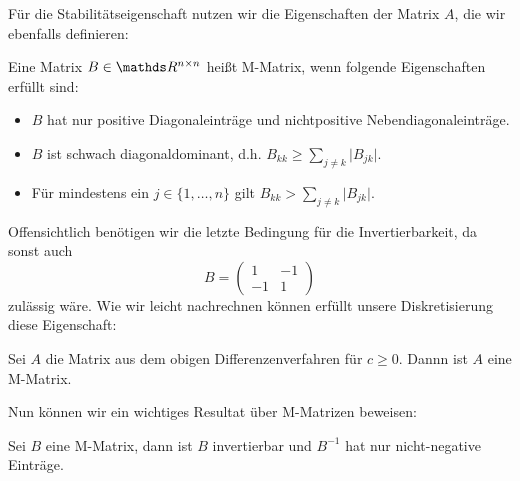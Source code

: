 F\"ur die Stabilit\"atseigenschaft nutzen wir die Eigenschaften der Matrix $A$, die wir ebenfalls definieren:
\begin{definition}{}{}
Eine Matrix $B \in \R^{n \times n}$ hei{\ss}t M-Matrix, wenn folgende Eigenschaften erf\"ullt sind:
\begin{itemize}
\item $B$ hat nur positive Diagonaleintr\"age und nichtpositive Nebendiagonaleintr\"age.
\item $B$ ist schwach diagonaldominant, d.h. $B_{kk} \geq \sum_{j \neq k} \vert B_{jk} \vert $.
\item F\"ur mindestens ein $j \in \{1,\ldots,n\}$ gilt $B_{kk} > \sum_{j \neq k} \vert B_{jk} \vert $.
\end{itemize}
\end{definition}{}{}
Offensichtlich ben\"otigen wir die letzte Bedingung f\"ur die Invertierbarkeit, da sonst auch
$$ B= \left( \begin{array}{cc} 1 & -1 \\ -1 & 1 \end{array} \right) $$
zul\"assig w\"are. Wie wir leicht nachrechnen k\"onnen erf\"ullt unsere Diskretisierung diese Eigenschaft:
\begin{lemma}
Sei $A$ die Matrix aus dem obigen Differenzenverfahren f\"ur $c \geq 0$. Dannn ist $A$ eine M-Matrix.
\end{lemma} 
Nun k\"onnen wir ein wichtiges Resultat \"uber M-Matrizen beweisen:
\begin{lemma}
Sei $B$ eine M-Matrix, dann ist $B$ invertierbar und $B^{-1}$ hat nur nicht-negative Einträge.
\end{lemma}
